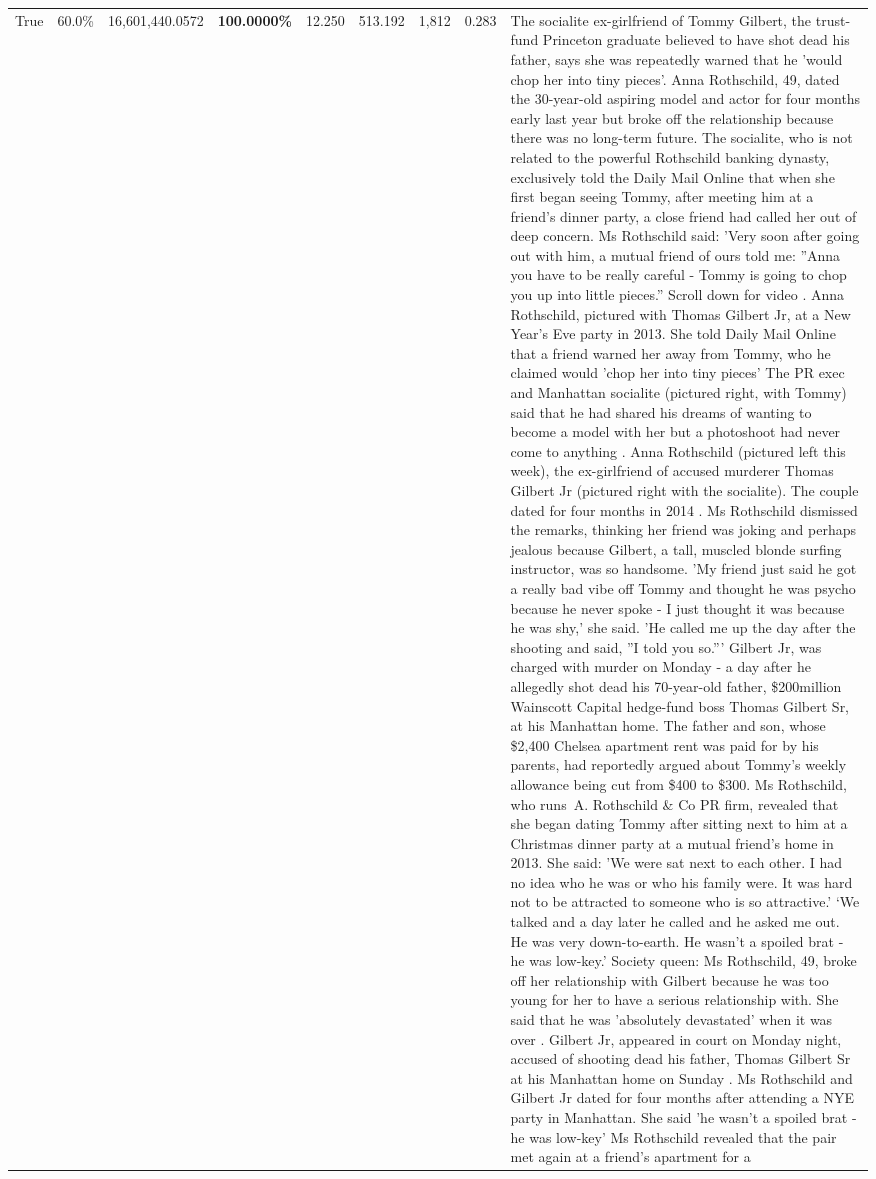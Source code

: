 \begin{table}[H]
\begin{tabular}{lllrlllll}
True & 60.0\% & 16,601,440.0572 & \bfseries \color{red} 100.0000\% & 12.250 & 513.192 & 1,812 & 0.283 & The socialite ex-girlfriend of Tommy Gilbert, the trust-fund Princeton graduate believed to have shot dead his father, says she was repeatedly warned that he 'would chop her into tiny pieces'. Anna Rothschild, 49, dated the 30-year-old aspiring model and actor for four months early last year but broke off the relationship because there was no long-term future. The socialite, who is not related to the powerful Rothschild banking dynasty, exclusively told the Daily Mail Online that when she first began seeing Tommy, after meeting him at a friend's dinner party, a close friend had called her out of deep concern. Ms Rothschild said: 'Very soon after going out with him, a mutual friend of ours told me: ''Anna you have to be really careful - Tommy is going to chop you up into little pieces.'' Scroll down for video . Anna Rothschild, pictured with Thomas Gilbert Jr, at a New Year's Eve party in 2013. She told Daily Mail Online that a friend warned her away from Tommy, who he claimed would 'chop her into tiny pieces' The PR exec and Manhattan socialite (pictured right, with Tommy) said that he had shared his dreams of wanting to become a model with her but a photoshoot had never come to anything . Anna Rothschild (pictured left this week), the ex-girlfriend of accused murderer Thomas Gilbert Jr (pictured right with the socialite). The couple dated for four months in 2014 . Ms Rothschild dismissed the remarks, thinking her friend was joking and perhaps jealous because Gilbert, a tall, muscled blonde surfing instructor, was so handsome. 'My friend just said he got a really bad vibe off Tommy and thought he was psycho because he never spoke - I just thought it was because he was shy,' she said. 'He called me up the day after the shooting and said, ''I told you so.''' Gilbert Jr, was charged with murder on Monday - a day after he allegedly shot dead his 70-year-old father, \$200million Wainscott Capital hedge-fund boss Thomas Gilbert Sr, at his Manhattan home. The father and son, whose \$2,400 Chelsea apartment rent was paid for by his parents, had reportedly argued about Tommy's weekly allowance being cut from \$400 to \$300. Ms Rothschild, who runs A. Rothschild \& Co PR firm, revealed that she began dating Tommy after sitting next to him at a Christmas dinner party at a mutual friend's home in 2013. She said: 'We were sat next to each other. I had no idea who he was or who his family were. It was hard not to be attracted to someone who is so attractive.' ‘We talked and a day later he called and he asked me out. He was very down-to-earth. He wasn’t a spoiled brat - he was low-key.’ Society queen: Ms Rothschild, 49, broke off her relationship with Gilbert because he was too young for her to have a serious relationship with. She said that he was 'absolutely devastated' when it was over . Gilbert Jr, appeared in court on Monday night, accused of shooting dead his father, Thomas Gilbert Sr at his Manhattan home on Sunday . Ms Rothschild and Gilbert Jr dated for four months after attending a NYE party in Manhattan. She said 'he wasn't a spoiled brat - he was low-key' Ms Rothschild revealed that the pair met again at a friend’s apartment for a 
\end{tabular}
\end{table}
